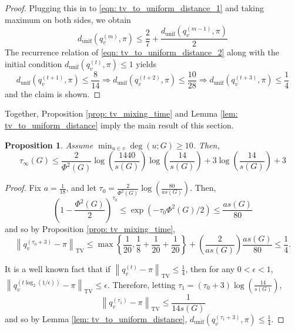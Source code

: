\documentclass[11pt,twoside]{article}
\newtheorem{proposition}{Proposition}
\newcommand{\set}[1]{\left\{#1\right\}}
\newcommand{\norm}[1]{\left\lVert#1\right\rVert}
\newcommand{\1}{\mathbf{1}}
\begin{document}
\begin{proof}
	Plugging this in to \eqref{eqn: tv_to_uniform_distance_1} and taking maximum on both sides, we obtain
	\begin{equation}
	d_{\textrm{unif}}(q_v^{(m)}, \pi) \leq \frac{2}{7} + \frac{d_{\textrm{unif}}(q_v^{(m - 1)}, \pi)}{2} \label{eqn: tv_to_uniform_distance_2}
	\end{equation}
	The recurrence relation of \eqref{eqn: tv_to_uniform_distance_2} along with the initial condition $d_{\textrm{unif}}(q_v^{(t)}, \pi) \leq 1$ yields
	\begin{equation*}
	d_{\textrm{unif}}(q_v^{(t + 1)}, \pi) \leq \frac{8}{14} \Rightarrow d_{\textrm{unif}}(q_v^{(t + 2)}, \pi) \leq \frac{10}{28} \Rightarrow  d_{\textrm{unif}}(q_v^{(t + 3)}, \pi) \leq \frac{1}{4}
	\end{equation*}
	and the claim is shown.
\end{proof}

Together, Proposition \ref{prop: tv_mixing_time} and Lemma \ref{lem: tv_to_uniform_distance} imply the main result of this section.

\begin{proposition}
	\label{prop: pointwise_mixing_time}
	Assume $\min_{u \in v} \deg(u; G) \geq 10$. Then,
	\begin{equation*}
	\tau_{\infty}(G) \leq \frac{2}{\Phi^2(G)} \log \left(\frac{1440}{s(G)}\right)\log \left(\frac{14}{s(G)}\right)  + 3 \log \left(\frac{14}{s(G)}\right) + 3
	\end{equation*}
\end{proposition}
\begin{proof}
	Fix $a = \frac{1}{18}$, and let $\tau_0 = \frac{2}{\Phi^2(G)} \log \left(\frac{80}{a s(G)}\right)$. Then,
	\begin{equation*}
	\left(1 - \frac{\Phi^2(G)}{2}\right)^{\tau_0} \leq \exp(- \tau_0\Phi^2(G)/2) \leq \frac{as(G)}{80}
	\end{equation*}
	and so by Proposition \ref{prop: tv_mixing_time},
	\begin{equation*}
	\norm{q_v^{(\tau_0 + 3)} - \pi}_{\mathrm{TV}} \leq \max \set{\frac{1}{20}, \frac{1}{8} + \frac{1}{20} + \frac{1}{20}} + \left(\frac{2}{as(G)}\right) \frac{as(G)}{80} \leq \frac{1}{4}.
	\end{equation*}
	
	It is a well known fact \cite{montenegro2002} that if $\norm{q_v^{(t)} - \pi}_{\mathrm{TV}} \leq \frac{1}{4}$, then for any $0 < \epsilon < 1$, $\norm{q_v^{(t\log_2(1/\epsilon))} - \pi}_{\mathrm{TV}} \leq \epsilon$. Therefore, letting $\tau_1 = (\tau_0 + 3) \log(\frac{14}{s(G)})$, 
	\begin{equation*}
	\norm{q_v^{(\tau_1)} - \pi}_{\mathrm{TV}} \leq \frac{1}{14 s(G)}
	\end{equation*}
	and so by Lemma \ref{lem: tv_to_uniform_distance}, $d_{\textrm{unif}}(q_v^{(\tau_1 + 3)}, \pi) \leq \frac{1}{4}$. 
\end{proof}
\end{document}
